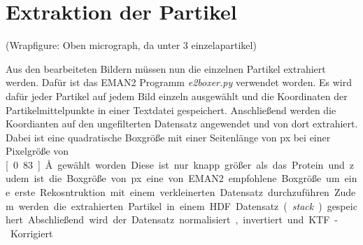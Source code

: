 \section{Extraktion der Partikel} %
\label{sec:extraktion_der_partikel}

(Wrapfigure: Oben micrograph, da unter 3 einzelapartikel)

Aus den bearbeiteten Bildern müssen nun die einzelnen Partikel extrahiert werden.
Dafür ist das EMAN2 Programm \textit{e2boxer.py} verwendet worden.
Es wird dafür jeder Partikel auf jedem Bild einzeln ausgewählt und die Koordinaten der Partikelmittelpunkte in einer Textdatei gespeichert.
Anschließend werden die Koordianten auf den ungefilterten Datensatz angewendet und von dort extrahiert.
Dabei ist eine quadratische Boxgröße mit einer Seitenlänge von \unit[512]{px} bei einer Pixelgröße von \unit[0.83]{\AA} gewählt worden.
Diese ist nur knapp größer als das Protein und zudem ist die Boxgröße von \unit[256]{px} eine von EMAN2 empfohlene Boxgröße um eine erste Rekosntruktion mit einem verkleinerten Datensatz durchzuführen.
Zudem werden die extrahierten Partikel in einem HDF Datensatz (\textit{stack}) gespeichert.
Abschließend wird der Datensatz normalisiert, invertiert und KTF-Korrigiert.

\FloatBarrier